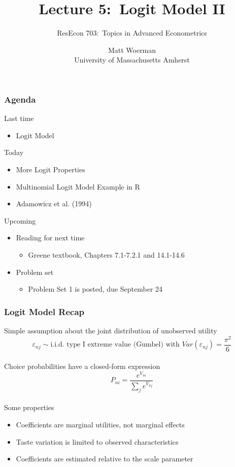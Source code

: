 \documentclass{beamer}
\title[Lecture 5:\ Logit Model II]{Lecture 5:\ Logit Model II}
\author[ResEcon 703:\ Advanced Econometrics]{ResEcon 703:\ Topics in Advanced Econometrics}
\date{Matt Woerman\\University of Massachusetts Amherst}
\begin{document}
{ 
\begin{frame}[noframenumbering]
    \titlepage
\end{frame}
}

\begin{frame}\frametitle{Agenda}
    Last time
    \begin{itemize}
        \item Logit Model
    \end{itemize}
    \vspace{2ex}
    Today
    \begin{itemize}
    	\item More Logit Properties
    	\item Multinomial Logit Model Example in R
    	\item Adamowicz et al. (1994)
    \end{itemize}
    \vspace{2ex}
    Upcoming
    \begin{itemize}
        \item Reading for next time
        \begin{itemize}
            \item Greene textbook, Chapters 7.1-7.2.1 and 14.1-14.6
        \end{itemize}
        \item Problem set
        \begin{itemize}
            \item Problem Set 1 is posted, due September 24
        \end{itemize}
    \end{itemize}
\end{frame}

\begin{frame}\frametitle{Logit Model Recap}
	Simple assumption about the joint distribution of unobserved utility
	$$\varepsilon_{nj} \sim \text{i.i.d.\ type I extreme value (Gumbel) with } Var(\varepsilon_{nj}) = \frac{\pi^2}{6}$$ \\
	\vspace{2ex}
	Choice probabilities have a closed-form expression
	$$P_{ni} = \frac{e^{V_{ni}}}{\sum_j e^{V_{nj}}}$$ \\
	\vspace{2ex}
	Some properties
	\begin{itemize}
		\item Coefficients are marginal utilities, not marginal effects
		\item Taste variation is limited to observed characteristics
		\item Coefficients are estimated relative to the scale parameter
	\end{itemize}
\end{frame}
\end{document}
